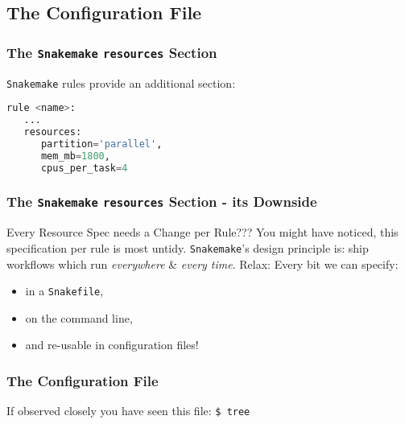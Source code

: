 \subsection{The Configuration File}

\begin{frame}[fragile]
  \frametitle{The \texttt{Snakemake} \texttt{resources} Section}
  \texttt{Snakemake} rules provide an additional  section:
  \begin{lstlisting}[language=Python,style=Python]
rule <name>:
   ...
   resources:
      partition='parallel',
      mem_mb=1800,
      cpus_per_task=4
  \end{lstlisting}
  \pause
\end{frame}

\begin{frame}
  \frametitle{The \texttt{Snakemake} \texttt{resources} Section - its Downside}
  \begin{alertblock}{Every Resource Spec needs a Change per Rule???}
   You might have noticed, this specification per rule is most untidy. \texttt{Snakemake}'s design principle is: ship workflows which run \emph{everywhere} \& \emph{every time}.
   \newline \pause
   Relax: Every bit we can specify:
   \begin{itemize}
    \item in a \texttt{Snakefile},
    \item on the command line,
    \item and re-usable in configuration files!
   \end{itemize}

  \end{alertblock}

\end{frame} 

\begin{frame}
  \frametitle{The Configuration File}
  If observed closely you have seen this file:\newline
            {\tiny \DTsetlength{0.2em}{1em}{0.2em}{0.4pt}{.6pt}
\texttt{\$ tree}
}
 \pause
 \pause
\end{frame}

